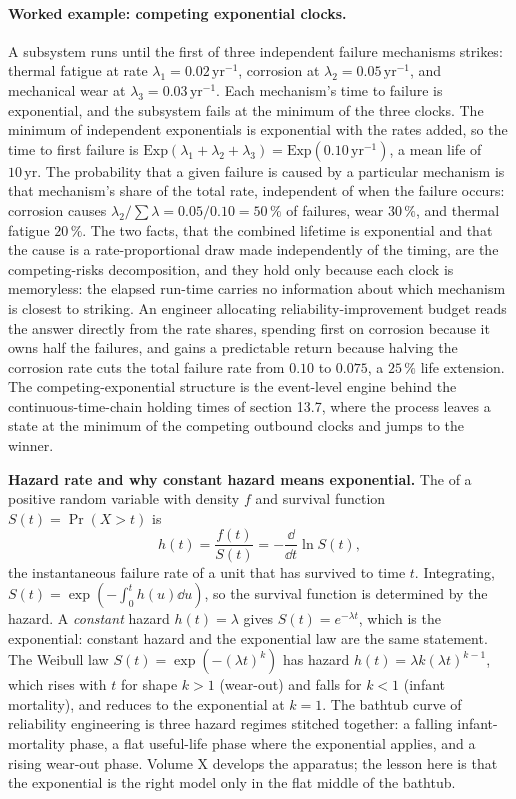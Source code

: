 \paragraph{Worked example: competing exponential clocks.} A subsystem
runs until the first of three independent failure mechanisms strikes:
thermal fatigue at rate $\lambda_{1} = 0.02\,\text{yr}^{-1}$, corrosion
at $\lambda_{2} = 0.05\,\text{yr}^{-1}$, and mechanical wear at
$\lambda_{3} = 0.03\,\text{yr}^{-1}$. Each mechanism's time to failure
is exponential, and the subsystem fails at the minimum of the three
clocks. The minimum of independent exponentials is exponential with the
rates added, so the time to first failure is $\mathrm{Exp}(\lambda_{1} +
\lambda_{2} + \lambda_{3}) = \mathrm{Exp}(0.10\,\text{yr}^{-1})$, a mean
life of $10\,\text{yr}$. The probability that a given failure is caused
by a particular mechanism is that mechanism's share of the total rate,
independent of when the failure occurs: corrosion causes
$\lambda_{2}/\sum\lambda = 0.05/0.10 = 50\,\%$ of failures, wear
$30\,\%$, and thermal fatigue $20\,\%$. The two facts, that the combined
lifetime is exponential and that the cause is a rate-proportional draw
made independently of the timing, are the competing-risks decomposition,
and they hold only because each clock is memoryless: the elapsed
run-time carries no information about which mechanism is closest to
striking. An engineer allocating reliability-improvement budget reads the
answer directly from the rate shares, spending first on corrosion because
it owns half the failures, and gains a predictable return because halving
the corrosion rate cuts the total failure rate from $0.10$ to $0.075$, a
$25\,\%$ life extension. The competing-exponential structure is the
event-level engine behind the continuous-time-chain holding times of
section 13.7, where the process leaves a state at the minimum of the
competing outbound clocks and jumps to the winner.

\begin{mastery}
\textbf{Hazard rate and why constant hazard means exponential.} The
 of a positive random variable with density
$f$ and survival function $S(t) = \Pr(X > t)$ is
\[
h(t) = \frac{f(t)}{S(t)} = -\frac{\dd}{\dd t} \ln S(t),
\]
the instantaneous failure rate of a unit that has survived to time
$t$. Integrating, $S(t) = \exp(-\int_{0}^{t} h(u) \dd u)$, so the
survival function is determined by the hazard. A \emph{constant}
hazard $h(t) = \lambda$ gives $S(t) = e^{-\lambda t}$, which is the
exponential: constant hazard and the exponential law are the same
statement. The Weibull law $S(t) = \exp(-(\lambda t)^{k})$ has
hazard $h(t) = \lambda k (\lambda t)^{k-1}$, which rises with $t$
for shape $k > 1$ (wear-out) and falls for $k < 1$ (infant
mortality), and reduces to the exponential at $k = 1$. The bathtub
curve of reliability engineering is three hazard regimes stitched
together: a falling infant-mortality phase, a flat useful-life
phase where the exponential applies, and a rising wear-out phase.
Volume X develops the apparatus; the lesson here is that the
exponential is the right model only in the flat middle of the
bathtub.
\end{mastery}


